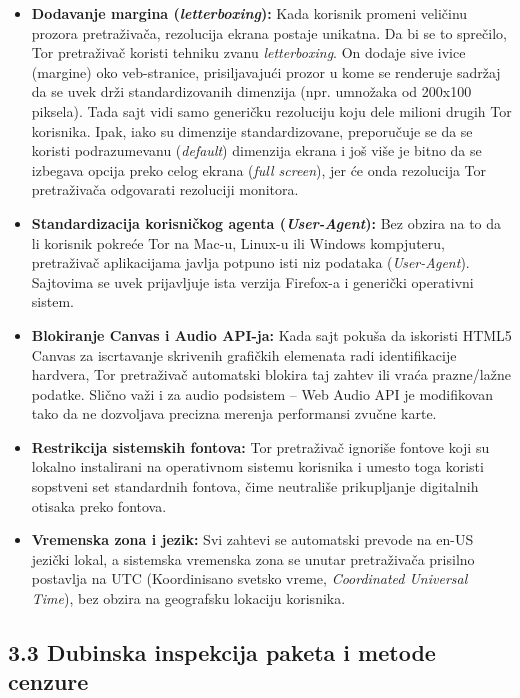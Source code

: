 \documentclass[
]{article}
\begin{document}
\begin{itemize}
\item
  \textbf{Dodavanje margina (\emph{letterboxing}):} Kada korisnik promeni veličinu prozora
  pretraživača, rezolucija ekrana postaje unikatna. Da bi se to sprečilo,
  Tor pretraživač koristi tehniku zvanu \emph{letterboxing}. On dodaje sive
  ivice (margine) oko veb-stranice, prisiljavajući prozor u kome se
  renderuje sadržaj da se uvek drži standardizovanih dimenzija (npr.
  umnožaka od 200x100 piksela). Tada sajt vidi samo generičku rezoluciju
  koju dele milioni drugih Tor korisnika. Ipak, iako su dimenzije
  standardizovane, preporučuje se da se koristi podrazumevanu (\emph{default}) dimenzija ekrana
  i još više je bitno da se izbegava opcija preko celog ekrana (\emph{full screen}), jer će onda
  rezolucija Tor pretraživača odgovarati rezoluciji monitora.
\item
  \textbf{Standardizacija korisničkog agenta (\emph{User-Agent}):} Bez obzira
  na to da li korisnik pokreće Tor na Mac-u, Linux-u ili Windows
  kompjuteru, pretraživač aplikacijama javlja potpuno isti niz podataka
  (\emph{User-Agent}). Sajtovima se uvek prijavljuje ista verzija Firefox-a i
  generički operativni sistem.
\item
  \textbf{Blokiranje Canvas i Audio API-ja:} Kada sajt pokuša da
  iskoristi HTML5 Canvas za iscrtavanje skrivenih grafičkih elemenata
  radi identifikacije hardvera, Tor pretraživač automatski blokira taj
  zahtev ili vraća prazne/lažne podatke. Slično važi i za audio
  podsistem -- Web Audio API je modifikovan tako da ne dozvoljava
  precizna merenja performansi zvučne karte.
\item
  \textbf{Restrikcija sistemskih fontova:} Tor pretraživač ignoriše
  fontove koji su lokalno instalirani na operativnom sistemu korisnika i
  umesto toga koristi sopstveni set standardnih fontova, čime neutrališe
  prikupljanje digitalnih otisaka preko fontova.
\item
  \textbf{Vremenska zona i jezik:} Svi zahtevi se automatski prevode na
  en-US jezički lokal, a sistemska vremenska zona se unutar pretraživača
  prisilno postavlja na UTC (Koordinisano svetsko vreme, \emph{Coordinated Universal Time}), bez
  obzira na geografsku lokaciju korisnika.
\end{itemize}

\subsection{3.3 Dubinska inspekcija paketa i metode cenzure}
\label{sec:t3.3}
\end{document}
